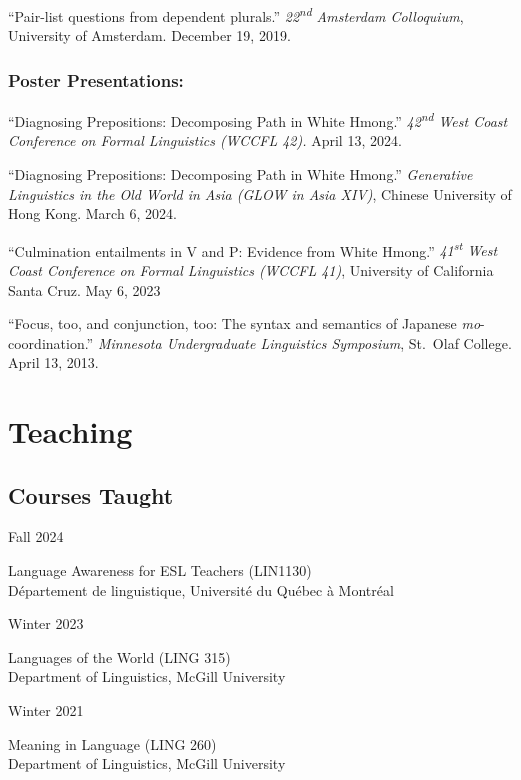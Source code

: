 \documentclass[11pt,oneside,DIV=8,parskip=off,letterpaper]{scrarticle} %
\newlength{\leftcolwidth}
\newlength{\mycolspace}
\newlength{\rightcolwidth}
\newlength{\spacingbefore}
\newlength{\spacingafter}
\newcommand{\myonecol}[1]{%
	\vspace{\spacingbefore}%
	\begin{minipage}[t]{\linewidth}%
		\strut#1%
	\end{minipage}%
	\vspace{\spacingafter}\par%
	}
\newcommand{\mytwocol}[2]{%
	\vspace{\spacingbefore}%
	\begin{minipage}[t]{\leftcolwidth}%
		\strut#1%
	\end{minipage}%
	\hspace{\mycolspace}%
	\begin{minipage}[t]{\rightcolwidth}%
		\strut#2%
	\end{minipage}%
	\vspace{\spacingafter}\par%
	}
\newcommand{\talk}[1]{%
	\myonecol{#1}%
	}
\newcommand{\cvline}[2]{%
	\mytwocol{#1}{#2}%
	}
\begin{document}
\talk{``Pair-list questions from dependent plurals.'' \textit{22\textsuperscript{nd} Amsterdam Colloquium}, University of Amsterdam. December 19, 2019.}

\subsubsection{Poster Presentations:}

\talk{``Diagnosing Prepositions: Decomposing Path in White Hmong.'' \textit{42\textsuperscript{nd} West Coast Conference on Formal Linguistics (WCCFL 42).} April 13, 2024.}

\talk{``Diagnosing Prepositions: Decomposing Path in White Hmong.'' \textit{Generative Linguistics in the Old World in Asia (GLOW in Asia XIV)}, Chinese University of Hong Kong. March 6, 2024.}

\talk{``Culmination entailments in V and P: Evidence from White Hmong.'' \textit{41\textsuperscript{st} West Coast Conference on Formal Linguistics (WCCFL 41)}, University of California Santa Cruz. May 6, 2023}

\talk{``Focus, too, and conjunction, too: The syntax and semantics of Japanese \textit{mo}-coordination.'' \textit{Minnesota Undergraduate Linguistics Symposium}, St.\ Olaf College. April 13, 2013.}

\section{Teaching}

\subsection{Courses Taught}
\cvline{Fall 2024}{%
	Language Awareness for ESL Teachers (LIN1130)\\
	Département de linguistique, Université du Québec à Montréal}
\cvline{Winter 2023}{%
	Languages of the World (LING 315)\\
	Department of Linguistics, McGill University}
\cvline{Winter 2021}{%
	Meaning in Language (LING 260)\\
	Department of Linguistics, McGill University}

\end{document}
